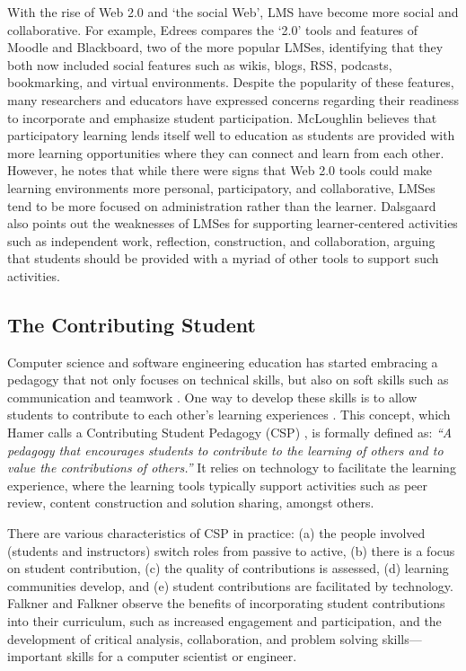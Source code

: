 With the rise of Web 2.0 and `the social Web', LMS have become more social and collaborative. For example, Edrees\cite{edrees2013elearning} compares the `2.0' tools and features of Moodle and Blackboard, two of the more popular LMSes, identifying that they both now included social features such as wikis, blogs, RSS, podcasts, bookmarking, and virtual environments. Despite the popularity of these features, many researchers and educators have expressed concerns regarding their readiness to incorporate and emphasize student participation. McLoughlin \cite{mcloughlin2007social} believes that participatory learning lends itself well to education as students are provided with more learning opportunities where they can connect and learn from each other. However, he notes that while there were signs that Web 2.0 tools could make learning environments more personal, participatory, and collaborative, LMSes tend to be more focused on administration rather than the learner. Dalsgaard \cite{dalsgaard2006social} also points out the weaknesses of LMSes for supporting learner-centered activities such as independent work, reflection, construction, and collaboration, arguing that students should be provided with a myriad of other tools to support such activities.

\subsection{The Contributing Student}
Computer science and software engineering education has started embracing a pedagogy that not only focuses on technical skills, but also on soft skills such as communication and teamwork \cite{jazayeri2004education}. One way to develop these skills is to allow students to contribute to each other's learning experiences \cite{hamer2006some}. This concept, which Hamer calls a Contributing Student Pedagogy (CSP) \cite{hamer2008contributing}, is formally defined as: \textit{``A pedagogy that encourages students to contribute to the learning of others and to value the contributions of others.''} It relies on technology to facilitate the learning experience, where the learning tools typically support activities such as peer review, content construction and solution sharing, amongst others.

There are various characteristics of CSP in practice: (a) the people involved (students and instructors) switch roles from passive to active, (b) there is a focus on student contribution, (c) the quality of contributions is assessed, (d) learning communities develop, and (e) student contributions are facilitated by technology. Falkner and Falkner \cite{falkner2012supporting} observe the benefits of incorporating student contributions into their curriculum, such as increased engagement and participation, and the development of critical analysis, collaboration, and problem solving skills---important skills for a computer scientist or engineer.

